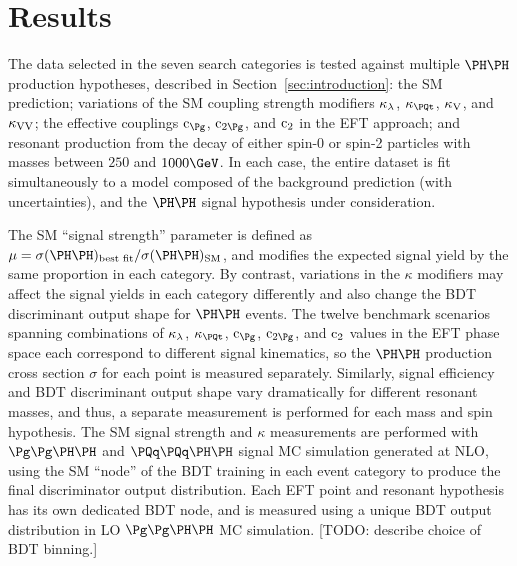 \section{Results}
\label{sec:results}

The data selected in the seven search categories 
is tested against multiple $\HH$ production hypotheses,
described in Section~\ref{sec:introduction}: the SM prediction;
variations of the SM coupling strength modifiers
$\kappa_{\lambda}$, $\kappat$, $\kappa_{\textrm{V}}$, and $\kappa_{\textrm{V}\textrm{V}}$;
the effective couplings $\cg$, $\cgg$, and $\text{c}_{2}$ in the EFT approach;
and resonant production from the decay of either spin-0 or
spin-2 particles with masses between $250$ and $1000\GeV$.
In each case, the entire dataset is fit simultaneously to a model
composed of the background prediction (with uncertainties),
and the $\HH$ signal hypothesis under consideration.

The SM ``signal strength'' parameter is defined as
$\mu = \sigma(\HH)_{\textrm{best fit}} / \sigma(\HH)_{\textrm{SM}}$,
and modifies the expected signal yield by the same proportion in each category.
By contrast, variations in the $\kappa$ modifiers may affect the signal yields in each
category differently and also change the BDT discriminant output shape for $\HH$ events.
The twelve benchmark scenarios spanning combinations of $\kappa_{\lambda}$, $\kappat$,
$\cg$, $\cgg$, and $\text{c}_{2}$ values in the EFT phase space each correspond to
different signal kinematics, so the $\HH$ production cross section $\sigma$
for each point is measured separately.
Similarly, signal efficiency and BDT discriminant output shape vary dramatically for different
resonant masses, and thus, a separate measurement is performed for each mass and spin hypothesis.
The SM signal strength and $\kappa$ measurements are performed with $\ggHH$ and
$\qqHH$ signal MC simulation generated at NLO, using the SM ``node'' of the BDT
training in each event category to produce the final discriminator output distribution.
Each EFT point and resonant hypothesis has its own dedicated BDT node, and
is measured using a unique BDT output distribution in LO $\ggHH$ MC simulation.
[TODO: describe choice of BDT binning.]


